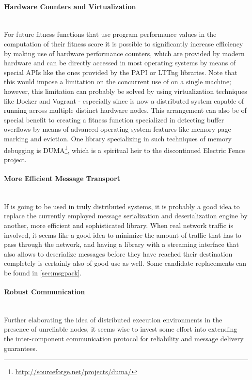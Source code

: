 \paragraph{Hardware Counters and Virtualization} ~\\
For future fitness functions that use program performance values in the computation of their
fitness score it is possible to significantly increase efficiency by making use of hardware performance
counters, which are provided by modern hardware and can be directly accessed in most operating systems by
means of special APIs like the ones provided by the {\small PAPI}\cite{Mucci99papi:a} or {\small LTTng}\cite{
combined_tracing_ols2009} libraries. Note that this would impose a limitation on the concurrent use of \xmlmate
on a single machine; however, this limitation can probably be solved by using virtualization techniques like
{\small Docker}\cite{docker} and {\small Vagrant}\cite{vagrant} - especially since \xmlmate is now a
distributed system capable of running across multiple distinct hardware nodes. This arrangement can also be of
special benefit to creating a fitness function specialized in detecting buffer overflows by means of advanced
operating system features like memory page marking and eviction. One library specializing in such techniques
of memory debugging is {\small DUMA}\footnote{\url{http://sourceforge.net/projects/duma/}}, which is a
spiritual heir to the discontinued Electric Fence project.
\paragraph{More Efficient Message Transport} ~\\
If \xmlmate is going to be used in truly distributed systems, it is probably a good idea to replace
the currently employed \msgpack message serialization and deserialization engine by another, more efficient and
sophisticated library. When real network traffic is involved, it seems like a good idea to minimize the amount
of traffic that has to pass through the network, and having a library with a streaming interface that also
allows to deserialize messages before they have reached their destination completely is certainly also of
good use as well. Some candidate replacements can be found in \cref{sec:msgpack}.
\paragraph{Robust Communication} ~\\
Further elaborating the idea of distributed execution environments in the presence of unreliable
nodes, it seems wise to invest some effort into extending the inter-component communication protocol for
reliability and message delivery guarantees.
